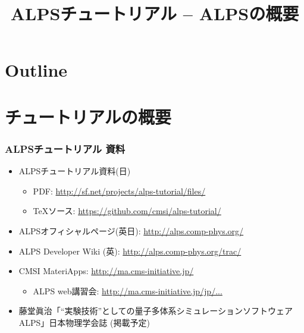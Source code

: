 \title{ALPSチュートリアル -- ALPSの概要}




\begin{frame}
  \titlepage
\end{frame}

\section*{Outline}
\begin{frame}
  \tableofcontents
\end{frame}

\section{チュートリアルの概要}

\begin{frame}
  \frametitle{ALPSチュートリアル 資料}
  \begin{itemize}
    \setlength{\itemsep}{1em}
  \item ALPSチュートリアル資料(日)
    \begin{itemize}
      \item PDF: {\footnotesize \url{http://sf.net/projects/alps-tutorial/files/}}
      \item \TeX ソース: {\footnotesize \url{https://github.com/cmsi/alps-tutorial/}}
    \end{itemize}
  \item ALPSオフィシャルページ(英日): {\footnotesize \url{http://alps.comp-phys.org/}}
  \item ALPS Developer Wiki (英): {\footnotesize \url{http://alps.comp-phys.org/trac/}}
  \item CMSI MateriApps: {\footnotesize \url{http://ma.cms-initiative.jp/}}
    \begin{itemize}
      \item ALPS web講習会: {\footnotesize \href{http://ma.cms-initiative.jp/ja/listapps/alps/ju6d5o/llgd83}{http://ma.cms-initiative.jp/jp/...}}
    \end{itemize}
  \item 藤堂眞治「``実験技術''としての量子多体系シミュレーションソフトウェアALPS」日本物理学会誌 (掲載予定)
  \end{itemize}
\end{frame}

